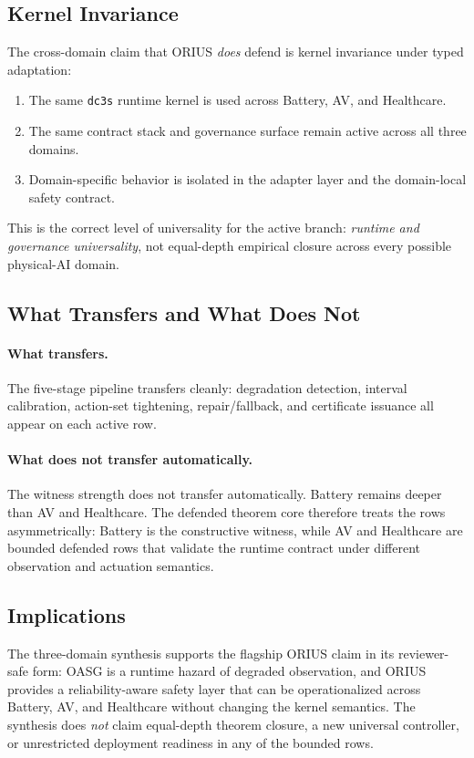 \subsection{Kernel Invariance}

The cross-domain claim that ORIUS \emph{does} defend is kernel invariance under
typed adaptation:
\begin{enumerate}[nosep]
  \item The same \texttt{dc3s} runtime kernel is used across Battery, AV, and
        Healthcare.
  \item The same contract stack and governance surface remain active across all
        three domains.
  \item Domain-specific behavior is isolated in the adapter layer and the
        domain-local safety contract.
\end{enumerate}

This is the correct level of universality for the active branch: \emph{runtime and
governance universality}, not equal-depth empirical closure across every possible
physical-AI domain.

\subsection{What Transfers and What Does Not}

\paragraph{What transfers.}
The five-stage \dcs{} pipeline transfers cleanly: degradation detection, interval
calibration, action-set tightening, repair/fallback, and certificate issuance all
appear on each active row.

\paragraph{What does not transfer automatically.}
The witness strength does not transfer automatically.  Battery remains deeper than
AV and Healthcare.  The defended theorem core therefore treats the rows
asymmetric\-ally: Battery is the constructive witness, while AV and Healthcare are
bounded defended rows that validate the runtime contract under different observation
and actuation semantics.

\subsection{Implications}

The three-domain synthesis supports the flagship ORIUS claim in its reviewer-safe
form: OASG is a runtime hazard of degraded observation, and ORIUS provides a
reliability-aware safety layer that can be operationalized across Battery, AV, and
Healthcare without changing the kernel semantics.  The synthesis does \emph{not}
claim equal-depth theorem closure, a new universal controller, or unrestricted
deployment readiness in any of the bounded rows.
